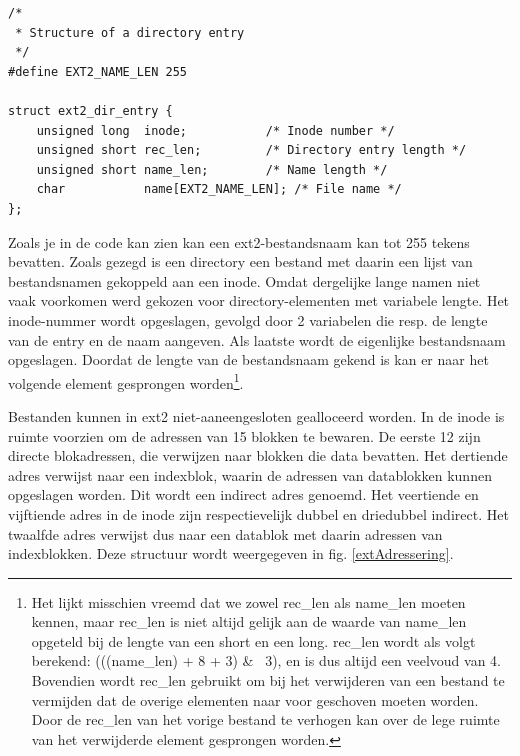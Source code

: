 \begin{verbatim}
/*
 * Structure of a directory entry
 */
#define EXT2_NAME_LEN 255

struct ext2_dir_entry {
    unsigned long  inode;           /* Inode number */
    unsigned short rec_len;         /* Directory entry length */
    unsigned short name_len;        /* Name length */
    char           name[EXT2_NAME_LEN]; /* File name */
};
\end{verbatim}

Zoals je in de code kan zien kan een ext2-bestandsnaam kan tot 255 tekens bevatten. Zoals gezegd is
een directory een bestand met daarin een lijst van bestandsnamen gekoppeld aan een inode. Omdat dergelijke
lange namen niet vaak voorkomen werd gekozen voor directory-elementen met variabele lengte. Het inode-nummer
wordt opgeslagen, gevolgd door 2 variabelen die resp. de lengte van de entry en de naam aangeven. Als laatste
wordt de eigenlijke bestandsnaam opgeslagen. Doordat de lengte van de bestandsnaam gekend is kan er
naar het volgende element gesprongen worden\footnote{Het lijkt misschien vreemd dat we zowel
rec\_len als name\_len moeten kennen, maar rec\_len is niet altijd gelijk aan de waarde van name\_len
opgeteld bij de lengte van een short en een long. rec\_len wordt als volgt berekend:
(((name\_len) + 8 + 3) \& ~3), en is dus altijd een veelvoud van 4. Bovendien wordt rec\_len
gebruikt om bij het verwijderen van een bestand te vermijden dat de overige elementen naar voor
geschoven moeten worden. Door de rec\_len van het vorige bestand te verhogen kan over de lege
ruimte van het verwijderde element gesprongen worden.}.

Bestanden kunnen in ext2 niet-aaneengesloten gealloceerd worden. In de inode is ruimte voorzien om de
adressen van 15 blokken te bewaren. De eerste 12 zijn directe blokadressen, die verwijzen naar blokken
die data bevatten. Het dertiende adres verwijst naar een indexblok, waarin de adressen van datablokken kunnen
opgeslagen worden. Dit wordt een indirect adres genoemd. Het veertiende en vijftiende adres in de inode
zijn respectievelijk dubbel en driedubbel indirect. Het twaalfde adres verwijst dus naar een datablok met
daarin adressen van indexblokken. Deze structuur wordt weergegeven in fig. \ref{extAdressering}.

